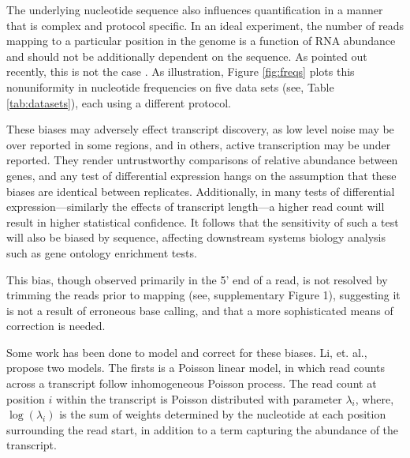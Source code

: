 \documentclass{bioinfo}
\begin{document}
The underlying nucleotide sequence also influences quantification in a manner
that is complex and protocol specific. In an ideal experiment, the number of
reads mapping to a particular position in the genome is a function of RNA
abundance and should not be additionally dependent on the sequence. As pointed
out recently, this is not the case \cite{Dohm2008} \cite{Li2010}
\cite{Hansen2010}. As illustration, Figure \ref{fig:freqs} plots this
nonuniformity in nucleotide frequencies on five data sets (see, Table
\ref{tab:datasets}), each using a different protocol.


These biases may adversely effect transcript discovery, as low level noise may
be over reported in some regions, and in others, active transcription may be
under reported. They render untrustworthy comparisons of relative abundance
between genes, and any test of differential expression hangs on the assumption
that these biases are identical between replicates.  Additionally, in many tests
of differential expression---similarly the effects of transcript length---a higher
read count will result in higher statistical confidence. It follows that the
sensitivity of such a test will also be biased by sequence, affecting downstream
systems biology analysis such as gene ontology enrichment tests.

This bias, though observed primarily in the 5' end of a read, is not resolved by
trimming the reads prior to mapping (see, supplementary Figure 1), suggesting
it is not a result of erroneous base calling, and that a more sophisticated
means of correction is needed.

\begin{comment}
\begin{figure*}
\begin{center}
\texttt{[image: fig/freqs.pdf]}
\end{center}
\caption{Nucleotide frequencies relative to the start of each read (labeled
position 0), respecting strand. The divergence of the nucleotide distribution
is summarized using the symmetrized Kullback-Leibler divergence (see Section
3).}
\label{fig:freqs}
\end{figure*}
\end{comment}


Some work has been done to model and correct for these biases.  Li, et. al.,
\cite{Li2010} propose two models. The firsts is a Poisson linear model, in which
read counts across a transcript follow inhomogeneous Poisson process. The read
count at position $i$ within the transcript is Poisson distributed with
parameter $\lambda_i$, where, $\log(\lambda_i)$ is the sum of weights determined by the
nucleotide at each position surrounding the read start, in addition to a term
capturing the abundance of the transcript.
\end{document}
